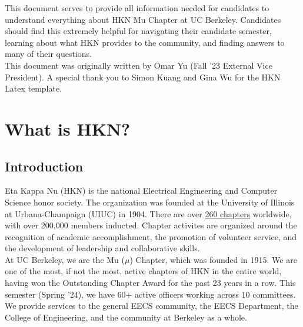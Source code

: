 \documentclass[11pt, article, oneside]{memoir}
\begin{document}
	\maketitle
	
	This document serves to provide all information needed for candidates to understand everything about HKN Mu Chapter at UC Berkeley.
    Candidates should find this extremely helpful for navigating their candidate semester, learning about what HKN provides to the community, and finding answers to many of their questions. \\

    This document was originally written by Omar Yu (Fall '23 External Vice President).
    A special thank you to Simon Kuang and Gina Wu for the HKN Latex template.
	
	\tableofcontents*
	\newpage

    
	\chapter{What is HKN?}
    \label{ch:what-is-hkn}

    \section{Introduction}
    \label{sec:introduction}
        Eta Kappa Nu (HKN) is the national Electrical Engineering and Computer Science honor society.
        The organization was founded at the University of Illinois at Urbana-Champaign (UIUC) in 1904.
        There are over \href{https://hkn.ieee.org/chapters/university-chapters}{260 chapters} worldwide, with over 200,000 members inducted.
        Chapter activites are organized around the recognition of academic accomplishment, the promotion of volunteer service, and the development of leadership and collaborative skills. \\

        At UC Berkeley, we are the Mu (\(\mu\)) Chapter, which was founded in 1915.
        We are one of the most, if not the most, active chapters of HKN in the entire world, having won the Outstanding Chapter Award for the past 23 years in a row.
        This semester (Spring '24), we have 60+ active officers working across 10 committees.
        We provide services to the general EECS community, the EECS Department, the College of Engineering, and the community at Berkeley as a whole.
        
\end{document}
